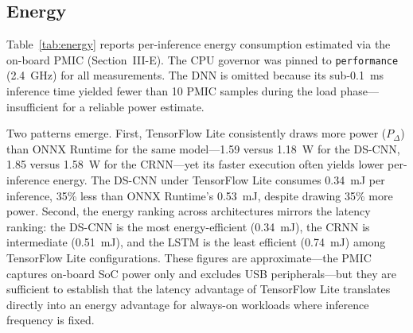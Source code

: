 \documentclass[conference,a4paper]{IEEEtran}
\begin{document}
\subsection{Energy}
\label{sec:energy}

Table~\ref{tab:energy} reports per-inference energy consumption estimated via the on-board PMIC (Section~III-E). The CPU governor was pinned to \texttt{performance} (2.4~GHz) for all measurements. The DNN is omitted because its sub-0.1~ms inference time yielded fewer than 10 PMIC samples during the load phase---insufficient for a reliable power estimate.

\begin{table}[t]
\caption{Per-inference energy on the Raspberry Pi 5 (performance governor, 2.4~GHz). $P_\Delta$ is the mean on-board SoC power during inference minus the idle baseline. Energy $E = P_\Delta \times t_\text{lat}$. The DNN is omitted due to insufficient PMIC sampling during its sub-0.1~ms inference (Section~III-E).}
\label{tab:energy}
\centering
{\footnotesize
\setlength{\tabcolsep}{3pt}
}
\end{table}

Two patterns emerge. First, TensorFlow Lite consistently draws more power ($P_\Delta$) than ONNX Runtime for the same model---1.59 versus 1.18~W for the DS-CNN, 1.85 versus 1.58~W for the CRNN---yet its faster execution often yields lower per-inference energy. The DS-CNN under TensorFlow Lite consumes 0.34~mJ per inference, 35\% less than ONNX Runtime's 0.53~mJ, despite drawing 35\% more power. Second, the energy ranking across architectures mirrors the latency ranking: the DS-CNN is the most energy-efficient (0.34~mJ), the CRNN is intermediate (0.51~mJ), and the LSTM is the least efficient (0.74~mJ) among TensorFlow Lite configurations. These figures are approximate---the PMIC captures on-board SoC power only and excludes USB peripherals---but they are sufficient to establish that the latency advantage of TensorFlow Lite translates directly into an energy advantage for always-on workloads where inference frequency is fixed.
\end{document}
